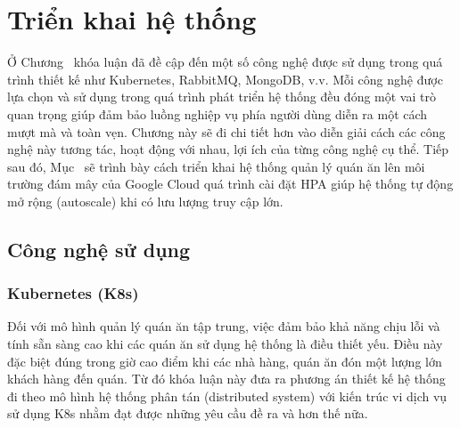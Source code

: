 \chapter{Triển khai hệ thống}\label{chap3}
Ở Chương~ khóa luận đã đề cập đến một số công nghệ được sử dụng trong quá trình thiết kế như Kubernetes, RabbitMQ, MongoDB, v.v.
Mỗi công nghệ được lựa chọn và sử dụng trong quá trình phát triển hệ thống đều đóng một vai trò quan trọng giúp đảm bảo luồng nghiệp vụ phía người dùng diễn ra một cách mượt mà và toàn vẹn.
Chương này sẽ đi chi tiết hơn vào diễn giải cách các công nghệ này tương tác, hoạt động với nhau, lợi ích của từng công nghệ cụ thể.
Tiếp sau đó, Mục~ sẽ trình bày cách triển khai hệ thống quản lý quán ăn lên môi trường đám mây của Google Cloud quá trình cài đặt HPA giúp hệ thống tự động mở rộng (autoscale) khi có lưu lượng truy cập lớn.
\section{Công nghệ sử dụng} \label{sec:tehcnologies-used}
\subsection{Kubernetes (K8s)}
Đối với mô hình quản lý quán ăn tập trung, việc đảm bảo khả năng chịu lỗi và tính sẵn sàng cao khi các quán ăn sử dụng hệ thống là điều thiết yếu.
Điều này đặc biệt đúng trong giờ cao điểm khi các nhà hàng, quán ăn đón một lượng lớn khách hàng đến quán.
Từ đó khóa luận này đưa ra phương án thiết kế hệ thống đi theo mô hình hệ thống phân tán (distributed system) với kiến trúc vi dịch vụ sử dụng K8s nhằm đạt được những yêu cầu đề ra và hơn thế nữa.

